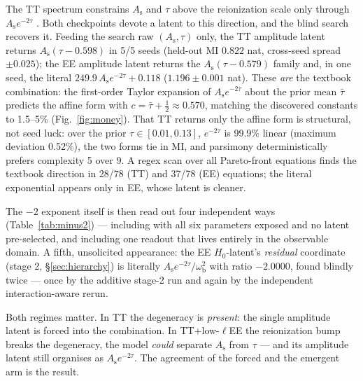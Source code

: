 \documentclass[twocolumn,10pt]{article}
\newcommand{\As}{A_\mathrm{s}}
\newcommand{\omB}{\omega_\mathrm{b}}
\newcommand{\Hz}{H_0}
\newcommand{\combo}{\As e^{-2\tau}}
\begin{document}
The TT spectrum constrains $\As$ and $\tau$ above the reionization scale only
through $\combo$ \citep{planck2018}. Both checkpoints devote a latent to this
direction, and the blind search recovers it. Feeding the search raw
$(\As,\tau)$ only, the TT amplitude latent returns $\As(\tau-0.598)$ in 5/5
seeds (held-out MI $0.822$ nat, cross-seed spread $\pm0.025$); the EE amplitude
latent returns the $\As(\tau-0.579)$ family and, in one seed, the literal
$249.9\,\combo+0.118$ ($1.196\pm0.001$ nat). These \emph{are} the textbook
combination: the first-order Taylor expansion of $\combo$ about the prior mean
$\bar\tau$ predicts the affine form with $c=\bar\tau+\tfrac12\approx0.570$,
matching the discovered constants to 1.5--5\% (Fig.~\ref{fig:money}). That TT
returns only the affine form is structural, not seed luck: over the prior
$\tau\in[0.01,0.13]$, $e^{-2\tau}$ is 99.9\% linear (maximum deviation 0.52\%),
the two forms tie in MI, and parsimony deterministically prefers complexity 5
over 9. A regex scan over all Pareto-front equations finds the textbook
direction in 28/78 (TT) and 37/78 (EE) equations; the literal exponential
appears only in EE, whose latent is cleaner.

The $-2$ exponent itself is then read out four independent ways
(Table~\ref{tab:minus2}) --- including with all six parameters exposed and no
latent pre-selected, and including one readout that lives entirely in the
observable domain. A fifth, unsolicited appearance: the EE $\Hz$-latent's
\emph{residual} coordinate (stage 2, \S\ref{sec:hierarchy}) is literally
$\combo/\omB^2$ with ratio $-2.0000$, found blindly twice --- once by the
additive stage-2 run and again by the independent interaction-aware rerun.

Both regimes matter. In TT the degeneracy is \emph{present}: the single
amplitude latent is forced into the combination. In TT+low-$\ell$EE the
reionization bump breaks the degeneracy, the model \emph{could} separate
$\As$ from $\tau$ --- and its amplitude latent still organises as $\combo$.
The agreement of the forced and the emergent arm is the result.
\end{document}
